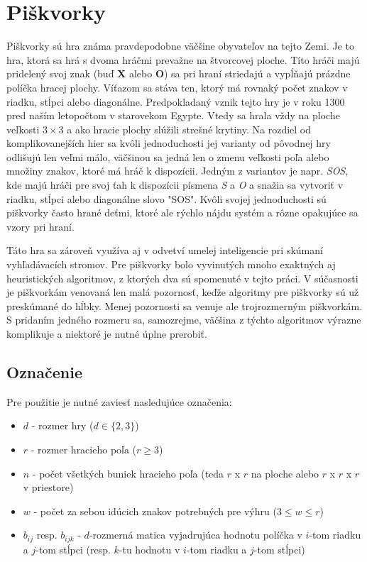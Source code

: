 \section{Piškvorky}\label{sec:tic-tac-toe}

Piškvorky sú hra známa pravdepodobne väčšine obyvateľov na tejto Zemi.
Je to hra, ktorá sa hrá s dvoma hráčmi prevažne na štvorcovej ploche.
Títo hráči majú pridelený svoj znak (buď \textbf{X} alebo \textbf{O}) sa pri hraní striedajú a vypĺňajú prázdne políčka
hracej plochy.
Víťazom sa stáva ten, ktorý má rovnaký počet znakov v riadku, stĺpci alebo diagonálne.
Predpokladaný vznik tejto hry je v roku 1300 pred naším letopočtom v starovekom
Egypte.\cite{tic_tac_toe_first_appearance}
Vtedy sa hrala vždy na ploche veľkosti $3 \times 3$ a ako hracie plochy slúžili strešné krytiny.
Na rozdiel od komplikovanejších hier sa kvôli jednoduchosti jej varianty od pôvodnej hry odlišujú len veľmi
málo,\cite{tic_tac_toe_variants} väčšinou sa jedná len o zmenu veľkosti poľa alebo množiny znakov, ktoré má hráč k
dispozícii.
Jedným z variantov je napr. \emph{SOS}, kde majú hráči pre svoj ťah k dispozícii písmena \emph{S} a \emph{O} a snažia
sa vytvoriť v riadku, stĺpci alebo diagonálne slovo "SOS".\cite{tic_tac_toe_sos}
Kvôli svojej jednoduchosti sú piškvorky často hrané deťmi, ktoré ale rýchlo nájdu systém a rôzne opakujúce sa vzory
pri hraní.

Táto hra sa zároveň využíva aj v odvetví umelej inteligencie pri skúmaní vyhľadávacích stromov.
Pre piškvorky bolo vyvinutých mnoho exaktných aj heuristických algoritmov, z ktorých dva sú spomenuté v tejto práci.
V súčasnosti je piškvorkám venovaná len malá pozornosť, keďže algoritmy pre piškvorky sú už preskúmané do hĺbky.
Menej pozornosti sa venuje ale trojrozmerným piškvorkám.
S pridaním jedného rozmeru sa, samozrejme, väčšina z týchto algoritmov výrazne komplikuje a niektoré je nutné úplne
prerobiť.

\subsection{Označenie}\label{subsec:label}

Pre použitie je nutné zaviesť nasledujúce označenia:
\begin{itemize}
    \item $d$ - rozmer hry ($d \in \{2,3\}$)
    \item $r$ - rozmer hracieho poľa ($r \geq 3$)
    \item $n$ - počet všetkých buniek hracieho poľa (teda $r$ x $r$ na ploche alebo $r$ x $r$ x $r$ v priestore)
    \item $w$ - počet za sebou idúcich znakov potrebných pre výhru ($3 \leq w \leq r$)
    \item $b_{ij}$ resp. $b_{ijk}$ - $d$-rozmerná matica vyjadrujúca hodnotu políčka v $i$-tom riadku a $j$-tom
    stĺpci (resp. $k$-tu hodnotu v $i$-tom riadku a $j$-tom stĺpci)
\end{itemize}

